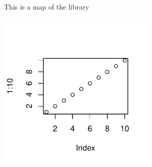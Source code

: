 \documentclass{article}
\begin{document}
This is a map of the library

\includegraphics[width=3in]{rplot.pdf}



\end{document}
